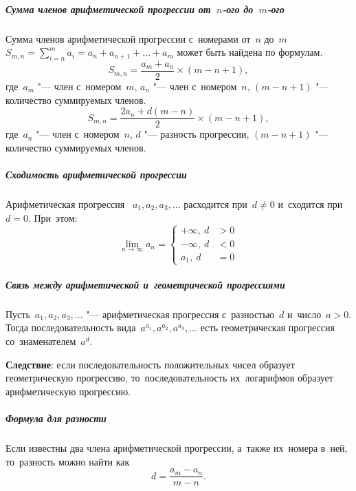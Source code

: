 \documentclass[]{scrartcl}
\begin{document}
{{\subparagraph{Сумма членов арифметической прогрессии от~${\textstyle n}$-ого до~${\textstyle m}$-ого}
Сумма членов арифметической прогрессии с~номерами от~${\textstyle n}$ до~${\textstyle m}$ ${\textstyle S_{m,n}=\sum_{i=n}^{m}a_{i}=a_{n}+a_{n+1}+\ldots +a_{m}}$  может быть найдена по формулам.
\begin{equation}\label{eq:arithmetic-progression-10}
S_{m,n}={\frac{a_{m}+a_{n}}{2}}\times (m-n+1),
\end{equation}
где~${\textstyle a_{m}}$ "--- член с~номером~${\textstyle m}$, ${\textstyle a_{n}}$ "--- член с~номером~${\textstyle n}$, ${\textstyle (m-n+1)}$ "--- количество суммируемых членов.
\begin{equation}\label{eq:arithmetic-progression-11}
S_{m,n}={\frac{2a_{n}+d(m-n)}{2}}\times (m-n+1),
\end{equation}
где~${\textstyle a_{n}}$ "--- член с~номером~${\textstyle n}$, ${\textstyle d}$ "--- разность прогрессии, ${\textstyle (m-n+1)}$ "--- количество суммируемых членов.
\subparagraph{Сходимость арифметической прогрессии}
Арифметическая прогрессия~ ${\textstyle a_{1},a_{2},a_{3},\ldots}$ расходится при~${\textstyle d\neq 0}$ и~сходится при~${\textstyle d=0}$. При~этом:
\begin{equation}\label{eq:arithmetic-progression-12}
\lim_{n\rightarrow \infty }a_{n}=\left\{{
	\begin{matrix}+\infty ,\ d&>0\\
	-\infty ,\ d&<0\\
	a_{1},\ d&=0
	\end{matrix}}\right.
\end{equation}
\subparagraph{Связь между арифметической и~геометрической прогрессиями}
Пусть~${\textstyle a_{1}, a_{2}, a_{3},\ldots}$ "--- арифметическая прогрессия с~разностью~${\displaystyle d}$ и~число~${\textstyle a>0}$. Тогда последовательность вида~${\textstyle a^{a_{1}},a^{a_{2}},a^{a_{3}},\ldots}$  есть геометрическая прогрессия со~знаменателем~${\textstyle a^{d}}$.

\textbf{Следствие}: если последовательность положительных чисел образует геометрическую прогрессию, то~последовательность их~логарифмов образует арифметическую прогрессию. 

\subparagraph{Формула для разности}
Если известны два члена арифметической прогрессии, а~также их~номера в~ней, то~разность можно найти как
\begin{equation}\label{eq:arithmetic-progression-13}
d={\frac{a_{m}-a_{n}}{m-n}}.
\end{equation}

}}
\end{document}
